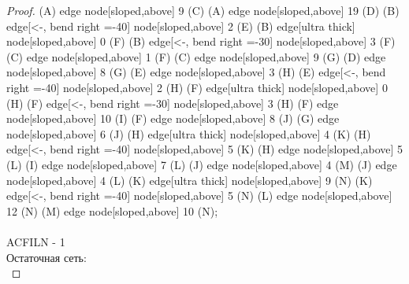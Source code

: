 \begin{proof}
{    (A) edge node[sloped,above] {9} (C)
    (A) edge node[sloped,above] {19} (D)
    (B) edge[<-, bend right =-40] node[sloped,above] {2} (E)
    (B) edge[ultra thick] node[sloped,above] {0} (F)
    (B) edge[<-, bend right =-30] node[sloped,above] {3} (F)
    (C) edge node[sloped,above] {1} (F)
    (C) edge node[sloped,above] {9} (G)
    (D) edge node[sloped,above] {8} (G)
    (E) edge node[sloped,above] {3} (H)
    (E) edge[<-, bend right =-40] node[sloped,above] {2} (H)
    (F) edge[ultra thick] node[sloped,above] {0} (H)
    (F) edge[<-, bend right =-30] node[sloped,above] {3} (H)
    (F) edge node[sloped,above] {10} (I)
    (F) edge node[sloped,above] {8} (J)
    (G) edge node[sloped,above] {6} (J)
    (H) edge[ultra thick] node[sloped,above] {4} (K)
    (H) edge[<-, bend right =-40] node[sloped,above] {5} (K)
    (H) edge node[sloped,above] {5} (L)
    (I) edge node[sloped,above] {7} (L)
    (J) edge node[sloped,above] {4} (M)
    (J) edge node[sloped,above] {4} (L)
    (K) edge[ultra thick] node[sloped,above] {9} (N)
    (K) edge[<-, bend right =-40] node[sloped,above] {5} (N)
    (L) edge node[sloped,above] {12} (N)
    (M) edge node[sloped,above] {10} (N);
    }\\\\
    ACFILN - 1\\
    Остаточная сеть:\\
    \usetikzlibrary{graphs,automata,positioning}
\end{proof}
